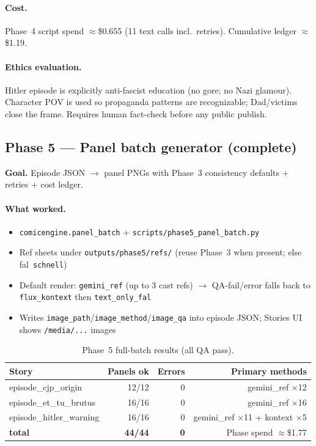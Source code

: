 \documentclass[10pt,twocolumn,letterpaper]{article}
\begin{document}
\paragraph{Cost.} Phase~4 script spend $\approx$\$0.655 (11 text calls incl.\ retries). Cumulative ledger $\approx$\$1.19.

\paragraph{Ethics evaluation.} Hitler episode is explicitly anti-fascist education (no gore; no Nazi glamour). Character POV is used so propaganda patterns are recognizable; Dad/victims close the frame. Requires human fact-check before any public publish.

\subsection{Phase 5 --- Panel batch generator (complete)}
\textbf{Goal.} Episode JSON $\rightarrow$ panel PNGs with Phase~3 consistency defaults + retries + cost ledger.

\paragraph{What worked.}
\begin{itemize}[leftmargin=*,itemsep=1pt]
  \item \texttt{comicengine.panel\_batch} + \texttt{scripts/phase5\_panel\_batch.py}
  \item Ref sheets under \texttt{outputs/phase5/refs/} (reuse Phase~3 when present; else fal~\texttt{schnell})
  \item Default render: \texttt{gemini\_ref} (up to 3 cast refs) $\rightarrow$ QA-fail/error falls back to \texttt{flux\_kontext} then \texttt{text\_only\_fal}
  \item Writes \texttt{image\_path}/\texttt{image\_method}/\texttt{image\_qa} into episode JSON; Stories UI shows \texttt{/media/...} images
\end{itemize}

\begin{table}[t]
\centering
\caption{Phase~5 full-batch results (all QA pass).}
\label{tab:p5}
\small
\begin{tabular}{@{}lrrr@{}}
\toprule
Story & Panels ok & Errors & Primary methods \\
\midrule
episode\_cjp\_origin & 12/12 & 0 & gemini\_ref $\times$12 \\
episode\_et\_tu\_brutus & 16/16 & 0 & gemini\_ref $\times$16 \\
episode\_hitler\_warning & 16/16 & 0 & gemini\_ref $\times$11 + kontext $\times$5 \\
\midrule
\textbf{total} & \textbf{44/44} & \textbf{0} & Phase spend $\approx$\$1.77 \\
\bottomrule
\end{tabular}
\end{table}
\end{document}
